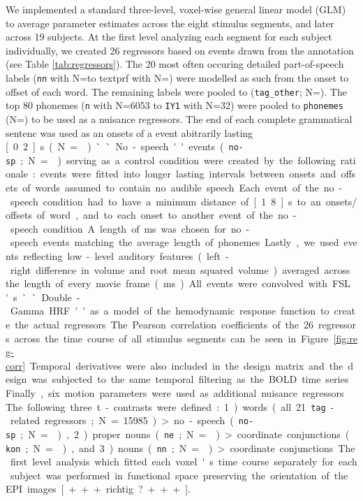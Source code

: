 \documentclass[10pt,a4paper,onecolumn]{article}
\begin{document}
We implemented a standard three-level, voxel-wise general linear model (GLM) to average parameter estimates across the eight stimulus segments, and later across 19 subjects.
At the first level analyzing each segment for each subject individually, we created 26 regressors based on events drawn from the annotation (see Table \ref{tab:regressors}).
The 20 most often occuring detailed part-of-speech labels (\texttt{nn} with N=\rNnAll\space to text{prf} with N=\rPrfAll) were modelled as such from the onset to offset of each word.
The remaining labels were pooled to (\texttt{tag\_other}; N=\rTagotherAll).
The top 80 phonemes (\texttt{n} with N=6053 to \texttt{IY1} with N=32) were pooled to \texttt{phonemes} (N=\rPhonesAll) to be used as a nuisance regressors.
The end of each complete grammatical sentenc was used as an onsets of a event abitrarily lasting \unit[0.2]{s} (N=\rSentenceAll).
``No-speech'' events (\texttt{no-sp}; N=\rNospAll) serving as a control condition were created by the following rationale:
events were fitted into longer lasting intervals between onsets and offsets of words assumed to contain no audible speech.
Each event of the no-speech condition had to have a minimum distance of \unit[1.8]{s} to an onsets/offsets of word, and to each onset to another event of the no-speech condition.
A length of \unit[70]{ms} was chosen for no-speech events matching the average length of phonemes.
Lastly, we used events reflecting low-level auditory features (left-right difference in volume and root mean squared volume) averaged across the length of every movie frame (\unit[40]{ms}).
All events were convolved with FSL's ``Double-Gamma HRF'' as a model of the hemodynamic response function to create the actual regressors.
The Pearson correlation coefficients of the 26 regressors across the time course of all stimulus segments can be seen in Figure \ref{fig:reg-corr}.
Temporal derivatives were also included in the design matrix and the design was subjected to the same temporal filtering as the BOLD time series.
Finally, six motion parameters were used as additional nuisance regressors.

The following three t-contrasts were defined:
1) words (all 21 \texttt{tag}-related regressors; N=15985) > no-speech (\texttt{no-sp}; N=\rNospAll),
2) proper nouns (\texttt{ne}; N=\rNeAll) > coordinate conjunctions (\texttt{kon}; N=\rKonAll), and
3) nouns (\texttt{nn}; N=\rNeAll) > coordinate conjunctions.
The first level analysis which fitted each voxel's time course separately for each subject was performed in functional space preserving the orientation of the EPI images [+++richtig?+++].
\end{document}
